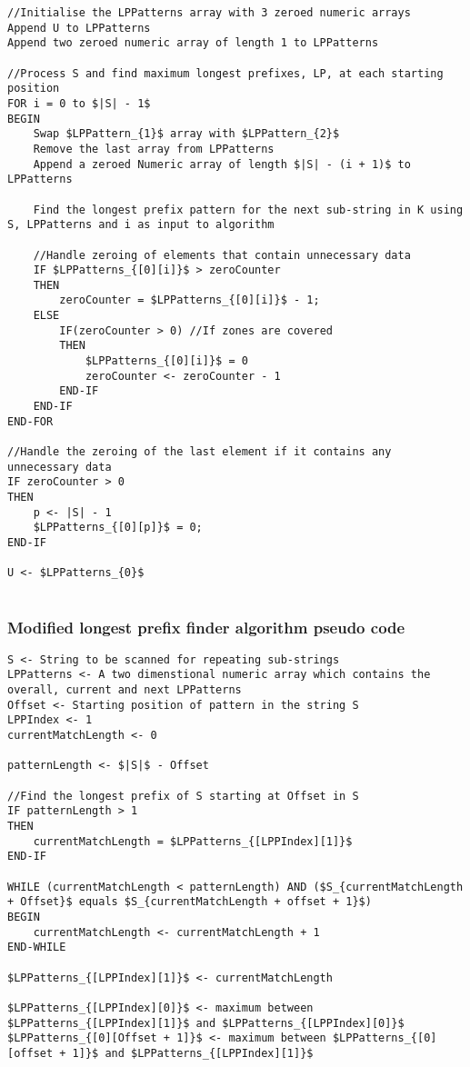 \documentclass[12pt]{article}
\begin{document}
\begin{flushleft}
\begin{lstlisting}
//Initialise the LPPatterns array with 3 zeroed numeric arrays
Append U to LPPatterns 
Append two zeroed numeric array of length 1 to LPPatterns

//Process S and find maximum longest prefixes, LP, at each starting position
FOR i = 0 to $|S| - 1$
BEGIN
	Swap $LPPattern_{1}$ array with $LPPattern_{2}$
	Remove the last array from LPPatterns    
	Append a zeroed Numeric array of length $|S| - (i + 1)$ to LPPatterns
	
	Find the longest prefix pattern for the next sub-string in K using S, LPPatterns and i as input to algorithm
	
	//Handle zeroing of elements that contain unnecessary data
	IF $LPPatterns_{[0][i]}$ > zeroCounter 
	THEN
		zeroCounter = $LPPatterns_{[0][i]}$ - 1;
	ELSE 
		IF(zeroCounter > 0) //If zones are covered
		THEN
			$LPPatterns_{[0][i]}$ = 0
			zeroCounter <- zeroCounter - 1
		END-IF                   
	END-IF
END-FOR

//Handle the zeroing of the last element if it contains any unnecessary data
IF zeroCounter > 0
THEN
	p <- |S| - 1
	$LPPatterns_{[0][p]}$ = 0;
END-IF

U <- $LPPatterns_{0}$


\end{lstlisting}

\newpage
\subsubsection{Modified longest prefix finder algorithm pseudo code}

\begin{lstlisting}
S <- String to be scanned for repeating sub-strings
LPPatterns <- A two dimenstional numeric array which contains the overall, current and next LPPatterns 
Offset <- Starting position of pattern in the string S
LPPIndex <- 1 
currentMatchLength <- 0

patternLength <- $|S|$ - Offset

//Find the longest prefix of S starting at Offset in S
IF patternLength > 1 
THEN
	currentMatchLength = $LPPatterns_{[LPPIndex][1]}$
END-IF

WHILE (currentMatchLength < patternLength) AND ($S_{currentMatchLength + Offset}$ equals $S_{currentMatchLength + offset + 1}$)
BEGIN
	currentMatchLength <- currentMatchLength + 1
END-WHILE

$LPPatterns_{[LPPIndex][1]}$ <- currentMatchLength

$LPPatterns_{[LPPIndex][0]}$ <- maximum between $LPPatterns_{[LPPIndex][1]}$ and $LPPatterns_{[LPPIndex][0]}$
$LPPatterns_{[0][Offset + 1]}$ <- maximum between $LPPatterns_{[0][offset + 1]}$ and $LPPatterns_{[LPPIndex][1]}$


\end{lstlisting}
\end{flushleft}
\end{document}
